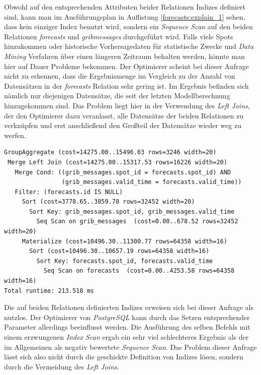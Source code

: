 Obwohl auf den entsprechenden Attributen beider Relationen Indizes
definiert sind, kann man im Ausführungsplan in Auflistung
\ref{forecasts:explain_1} sehen, dass kein einziger Index benutzt
wird, sondern ein \textit{Sequence Scan} auf den beiden Relationen
\textit{forecasts} und \textit{grib\textunderscore messages}
durchgeführt wird. Falls viele Spots hinzukommen oder historische
Vorhersagedaten für statistische Zwecke und \textit{Data Mining}
Verfahren über einen längeren Zeitraum behalten werden, könnte man
hier auf Dauer Probleme bekommen. Der Optimierer scheint bei dieser
Anfrage nicht zu erkennen, dass die Ergebnismenge im Vergleich zu der
Anzahl von Datensätzen in der \textit{forecasts} Relation sehr gering
ist. Im Ergebnis befinden sich nämlich nur diejenigen Datensätze, die
seit der letzten Modellberechnung hinzugekommen sind. Das Problem
liegt hier in der Verwendung des \textit{Left Joins}, der den
Optimierer dazu veranlasst, alle Datensätze der beiden Relationen zu
verknüpfen und erst anschließend den Großteil der Datensätze wieder
weg zu werfen.

\begin{lstlisting}[captionpos=b, caption=Ausführungsplan des Left Joins, label=forecasts:explain_1]
GroupAggregate (cost=14275.00..15496.03 rows=3246 width=20)
 Merge Left Join (cost=14275.00..15317.53 rows=16226 width=20)
   Merge Cond: ((grib_messages.spot_id = forecasts.spot_id) AND 
                (grib_messages.valid_time = forecasts.valid_time))
   Filter: (forecasts.id IS NULL)
     Sort (cost=3778.65..3859.78 rows=32452 width=20)
       Sort Key: grib_messages.spot_id, grib_messages.valid_time
         Seq Scan on grib_messages  (cost=0.00..678.52 rows=32452 width=20)
     Materialize (cost=10496.30..11300.77 rows=64358 width=16)
       Sort (cost=10496.30..10657.19 rows=64358 width=16)
         Sort Key: forecasts.spot_id, forecasts.valid_time
           Seq Scan on forecasts  (cost=0.00..4253.58 rows=64358 width=16)
Total runtime: 213.518 ms
\end{lstlisting}

Die auf beiden Relationen definierten Indizes erweisen sich bei dieser
Anfrage als nutzlos. Der Optimierer von \textit{PostgreSQL} kann durch
das Setzen entsprechender Parameter allerdings beeinflusst werden. Die
Ausführung des selben Befehls mit einem erzwungenen \textit{Index
  Scan} ergab ein sehr viel schlechteres Ergebnis als der im
Allgemeinen als negativ bewertete \textit{Sequence Scan}. Das Problem
dieser Anfrage lässt sich also nicht durch die geschickte Definition
von Indizes lösen, sondern durch die Vermeidung des \textit{Left
  Joins}.

